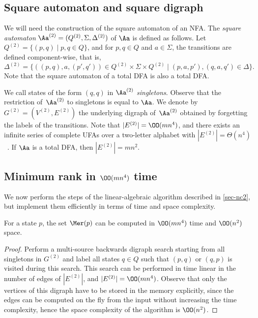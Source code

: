 \subsection{Square automaton and square digraph}\label{subsec:square-aut}

We will need the construction of the square automaton of an NFA. The \emph{square automaton} 
$\Aa^{(2)} = (Q^{(2)}, \Sigma, \Delta^{(2)})$ of $\Aa$ is defined as follows. Let $Q^{(2)} = \{(p, q) \mid p, q \in Q\}$, and for $p, q \in Q$ and $a \in \Sigma$, the transitions are defined component-wise, that is, 
\[\Delta^{(2)} = \{ ((p, q), a, (p', q')) \in Q^{(2)} \times \Sigma \times Q^{(2)} \mid (p, a, p'), (q,a,q') \in \Delta\}.\]
Note that the square automaton of a total DFA is also a total DFA. 


We call states of the form $(q, q)$ in $\Aa^{(2)}$ \emph{singletons}. Observe that the restriction of~$\Aa^{(2)}$ to singletons is equal to $\Aa$.
We denote by $G^{(2)} = (V^{(2)}, E^{(2)})$ the underlying digraph of~$\Aa^{(2)}$ obtained by forgetting the labels of the transitions. Note that $|E^{(2)}| = \OO(mn^4)$, and there exists an infinite series of complete UFAs over a two-letter alphabet with $|E^{(2)}| = \Theta(n^4)$~\cite[Appendix A]{Kiefer2019Arxiv}. If $\Aa$ is a total DFA, then $|E^{(2)}| = mn^2$.


\subsection{Minimum rank in \texorpdfstring{$\OO(mn^4)$}{O(n4)} time}\label{subsec:linalg-time}

We now perform the steps of the linear-algebraic algorithm described in \autoref{sec-nc2}, but implement them efficiently in terms of time and space complexity.

\begin{lem}\label{lem:mer-time}
    For a state $p$, the set $\Mer(p)$ can be computed in $\OO(mn^4)$ time and $\OO(n^2)$ space.
\end{lem}
\begin{proof}
    Perform a multi-source backwards digraph search starting from all singletons in $G^{(2)}$ and label all states $q \in Q$ such that $(p, q)$ or $(q, p)$ is visited during this search. This search can be performed in time linear in the number of edges of $|E^{(2)}|$, and $|E^{(2)}| = \OO(mn^4)$. 
    Observe that only the vertices of this digraph have to be stored in the memory explicitly, since the edges can be computed on the fly from the input without increasing the time complexity, hence the space complexity of the algorithm is $\OO(n^2)$.
\end{proof}

